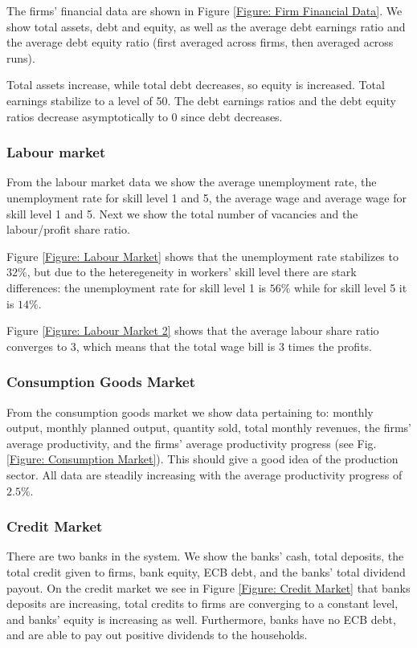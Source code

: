 The firms' financial data are shown in Figure \ref{Figure: Firm Financial Data}. We show total assets, debt and equity, as well as
the average debt earnings ratio and the average debt equity ratio (first averaged across firms, then averaged across runs).

Total assets increase, while total debt decreases, so equity is increased. Total earnings stabilize to a level of 50.
The debt earnings ratios and the debt equity ratios decrease asymptotically to 0 since debt decreases.

\subsubsection*{Labour market}
From the labour market data we show the average unemployment rate, the unemployment rate for skill level 1 and 5, the average wage and 
average wage for skill level 1 and 5. Next we show the total number of vacancies and the labour/profit share ratio.

Figure \ref{Figure: Labour Market} shows that the unemployment rate stabilizes to $32\%$, but due to the heteregeneity in workers' skill level there are stark differences: the unemployment rate for skill level 1 is $56\%$ while for skill level  5 it is $14\%$.

Figure \ref{Figure: Labour Market 2} shows that the average labour share ratio converges to 3, which means that the total wage bill is 3 times the profits.

\subsubsection*{Consumption Goods Market}
From the consumption goods market we show data pertaining to: monthly output, monthly planned output, quantity sold, total monthly revenues,
the firms' average productivity, and the firms' average productivity progress (see Fig. \ref{Figure: Consumption Market}). This should give a good idea of the production sector.
All data are steadily increasing with the average productivity progress of $2.5\%$.

\subsubsection*{Credit Market}
There are two banks in the system. 
We show the banks' cash, total deposits, the total credit given to firms, bank equity, ECB debt, and the banks' total dividend payout.
On the credit market we see in Figure \ref{Figure: Credit Market} that banks deposits are increasing, total credits to firms are converging to a constant level, and banks' equity is increasing as well. Furthermore, banks have no ECB debt, and are able to pay out positive dividends to the households.



